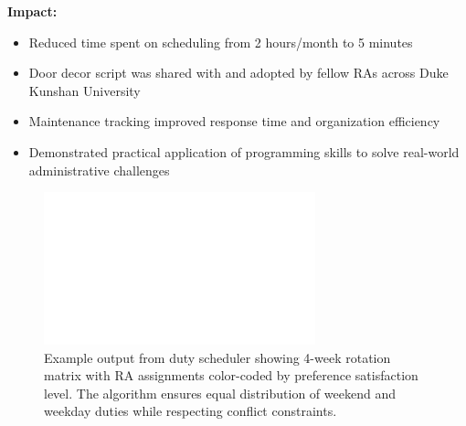 \vspace{0.5em}

\textbf{Impact:}
\begin{itemize}[leftmargin=1.2em, itemsep=0.1em]
  \item Reduced time spent on scheduling from 2 hours/month to 5 minutes
  \item Door decor script was shared with and adopted by fellow RAs across Duke Kunshan University
  \item Maintenance tracking improved response time and organization efficiency
  \item Demonstrated practical application of programming skills to solve real-world administrative challenges
\end{itemize}

\begin{figure}[h]
\centering
\includegraphics[width=0.7\textwidth]{assets/placeholder_1600x900.png}
\caption{Example output from duty scheduler showing 4-week rotation matrix with RA assignments color-coded by preference satisfaction level. The algorithm ensures equal distribution of weekend and weekday duties while respecting conflict constraints.}
\end{figure}


